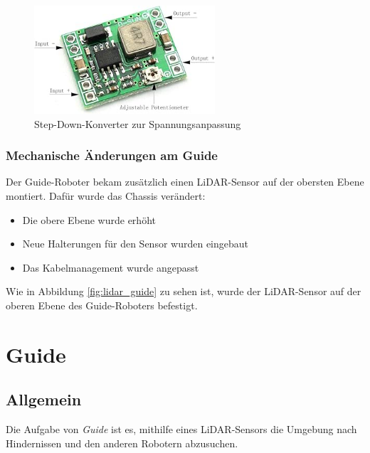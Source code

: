 \begin{figure}[H]
    \centering
    \includegraphics[width=0.6\textwidth]{img/Hardware/stepdown.png}
    \caption{Step-Down-Konverter zur Spannungsanpassung}
    \label{fig:stepdown}
\end{figure}

\subsubsection{Mechanische Änderungen am Guide}
Der Guide-Roboter bekam zusätzlich einen LiDAR-Sensor auf der obersten Ebene montiert.
%
Dafür wurde das Chassis verändert:
\begin{itemize}
    \item Die obere Ebene wurde erhöht
    \item Neue Halterungen für den Sensor wurden eingebaut
    \item Das Kabelmanagement wurde angepasst
\end{itemize}
Wie in Abbildung \ref{fig:lidar_guide} zu sehen ist,
wurde der LiDAR-Sensor auf der oberen Ebene des Guide-Roboters befestigt.





\section{Guide}
\label{subsec:hardware_guide}
\subsection{Allgemein}
Die Aufgabe von \textit{Guide} ist es,
mithilfe eines LiDAR-Sensors die Umgebung nach Hindernissen und den anderen Robotern abzusuchen.


